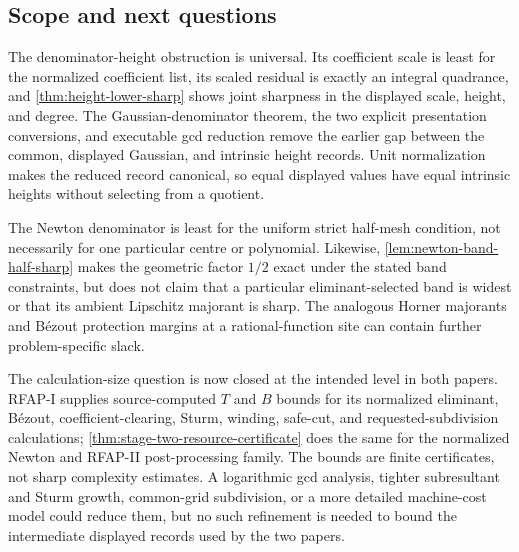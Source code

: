 \documentclass[11pt]{article}
\begin{document}
\subsection{Scope and next questions}

The denominator-height obstruction is universal.  Its coefficient scale is
least for the normalized coefficient list, its scaled residual is exactly an
integral quadrance, and \cref{thm:height-lower-sharp} shows joint sharpness in
the displayed scale, height, and degree.  The Gaussian-denominator theorem,
the two explicit presentation conversions, and executable gcd reduction
remove the earlier gap between the common, displayed Gaussian, and intrinsic
height records.  Unit normalization makes the reduced record canonical, so
equal displayed values have equal intrinsic heights without selecting from a
quotient.

The Newton denominator is least for the uniform strict half-mesh condition,
not necessarily for one particular centre or polynomial.  Likewise,
\cref{lem:newton-band-half-sharp} makes the geometric factor $1/2$ exact
under the stated band constraints, but does not claim that a particular
eliminant-selected band is widest or that its ambient Lipschitz majorant is
sharp.  The analogous Horner majorants and B\'ezout protection margins at a
rational-function site can contain further problem-specific slack.

The calculation-size question is now closed at the intended level in both
papers.  RFAP-I supplies source-computed $T$ and $B$ bounds for its normalized
eliminant, B\'ezout, coefficient-clearing, Sturm, winding, safe-cut, and
requested-subdivision calculations; \cref{thm:stage-two-resource-certificate}
does the same for the normalized Newton and RFAP-II post-processing family.
The bounds are finite certificates, not sharp complexity estimates.  A
logarithmic gcd analysis, tighter subresultant and Sturm growth, common-grid
subdivision, or a more detailed machine-cost model could reduce them, but no
such refinement is needed to bound the intermediate displayed records used
by the two papers.
\end{document}
